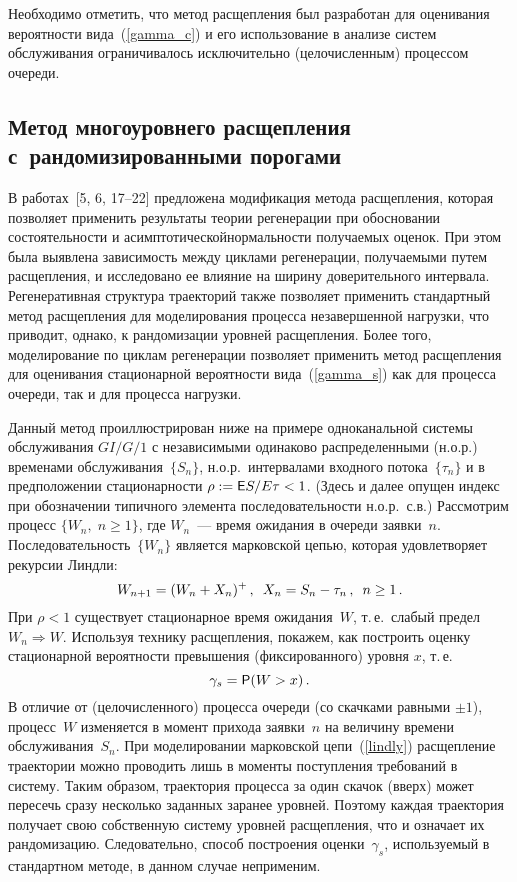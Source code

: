 \begin{multicols}{2}
Необходимо отметить, что  метод расщепления был разработан для
оценивания вероятности вида~(\ref{gamma_c}) и его использование в
анализе систем обслуживания ограничивалось  исключительно
(цело\-чис\-лен\-ным) процессом очереди.

\subsection{Метод многоуровнего расщепления с~рандомизированными
порогами} 

В работах~[5, 6, 17--22] предложена модификация метода расщепления, которая
позволяет применить   результаты теории регенерации при обос\-но\-ва\-нии
состоятельности и асимптотической\linebreak нормальности получаемых оценок.
При этом была выявлена зависимость между  циклами регенерации,
получаемыми путем расщепления,  и исследовано ее влияние на ширину
доверительного интервала. Регенеративная структура траекторий также
позволяет применить стандартный метод расщепления для моделирования
процесса незавершенной нагрузки, что приводит, однако,  к
рандомизации уровней расщепления. Более того, моделирование по
циклам регенерации позволяет применить метод расщепления для
оценивания стационарной вероятности вида~(\ref{gamma_s}) как для
процесса очереди, так и для процесса нагрузки.

Данный метод  проиллюстрирован ниже на примере одноканальной системы
обслуживания $GI/G/1$ с независимыми одинаково распределенными (н.о.р.) временами обслуживания~$\{S_n\}$,  
н.о.р.\ интервалами
входного потока~$\{\tau_n\}$ и в предположении стационарности
$\rho:={\sf E} S/E\tau<1$. (Здесь и далее
 опущен индекс при  обозначении типичного элемента последовательности н.о.р.\ с.в.) 
 Рас\-смот\-рим  процесс $\{W_n,\; n \ge 1\}$, где $W_n$~---
время ожидания в очереди заявки~$n$. Последовательность~$\{W_n\}$
является марковской цепью, которая удовлетворяет рекурсии Линдли:
\begin{equation}
W_{n+1} = (W_n + X_n)^+\,, \enskip X_n = S_n-\tau_n\,,\enskip n \ge 1\,.
\label{lindly}
\end{equation}
При $\rho<1$ существует  стационарное время ожидания~$W$, т.\,е.\
слабый предел $W_n \Rightarrow W$. Используя технику расщепления,
покажем, как построить оценку стационарной вероятности превышения
(фиксированного) уровня $x$, т.\,е.\
\begin{equation*}
\gamma_s = {\sf P} (W > x)\,.
\end{equation*}
В отличие от (целочисленного) процесса очереди (со скачками равными
$\pm 1$), процесс~$W$  изменяется в момент прихода заявки~$n$ на
величину времени обслуживания~$S_n$. При моделировании марковской
цепи~(\ref{lindly}) расщепление траектории можно  проводить лишь  в
моменты поступления требований в систему. Таким образом, траектория
процесса за один скачок (вверх) может пересечь сразу несколько
заданных заранее уровней. Поэтому каждая траектория получает свою
собственную систему уровней расщепления, что и означает их
рандомизацию. Следовательно, способ построения оценки~$\gamma_s$,
используемый  в стандартном методе,  в данном случае неприменим.


\end{multicols}
